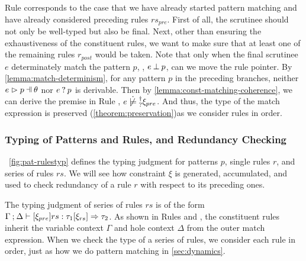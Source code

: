 Rule \TMatchNZPre corresponds to the case that we have already started pattern
matching and have already considered preceding rules $rs_{pre}$. First of all,
the scrutinee should not only be well-typed but also be final. Next, other than
ensuring the exhaustiveness of the constituent rules, we want to make sure that
at least one of the remaining rules $r_{post}$ would be taken. Note
that only when the final scrutinee $e$ determinately match the pattern $p$, \ie,
$e \mathbin{\bot} p$, can we move the rule pointer. By
\autoref{lemma:match-determinism}, for any pattern $p$ in the preceding
branches, neither $\hpatmatch{e}{p}{\theta}$ nor $e \mathbin{?} p$ is derivable.
Then by \autoref{lemma:const-matching-coherence}, we can derive the premise
in Rule \TMatchNZPre, $\cnotsatisfyormay{e}{\xi_{pre}}$. And thus, the type of
the match expression is preserved (\autoref{theorem:preservation})as we consider rules in order.

\subsubsection{Typing of Patterns and Rules, and Redundancy Checking}
\label{sec:pattyp}



\figurename~\ref{fig:pat-rulestyp} defines the typing judgment for patterns $p$,
single rules $r$, and series of rules $rs$. We will see how constraint $\xi$ is
generated, accumulated, and used to check redundancy of a rule $r$ with respect
to its preceding ones.

The typing judgment of series of rules $rs$ is of the form
$\Gamma \mathbin{;} \Delta \vdash [\xi_{pre}] rs : \tau_1 [\xi_{rs}] \Rightarrow \tau_2$. As shown
in Rules \TMatchZPre and \TMatchNZPre, the constituent rules inherit the
variable context $\Gamma$ and hole context $\Delta$ from the outer match
expression. When we check the type of a series of rules, we consider each rule
in order, just as how we do pattern matching in \autoref{sec:dynamics}.

